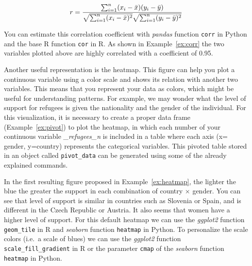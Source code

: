 $$
  r =
  \frac{ \sum_{i=1}^{n}(x_i-\bar{x})(y_i-\bar{y}) }{%
        \sqrt{\sum_{i=1}^{n}(x_i-\bar{x})^2}\sqrt{\sum_{i=1}^{n}(y_i-\bar{y})^2}}
$$

You can estimate this correlation coefficient with \emph{pandas} function \texttt{corr} in Python and the base R function \texttt{cor} in R. As shown in Example~\ref{ex:corr} the two variables plotted above are highly correlated with a coefficient of 0.95.


Another useful representation is the heatmap. This figure can help you plot a continuous variable using a color scale and shows its relation with another two variables.  This means that you represent your data as colors, which might be useful for understanding patterns. For example, we may wonder what  the level of support for refugees is given the nationality and the gender of the individual. For this visualization, it is necessary to create a proper data frame (Example~\ref{ex:pivot}) to plot the heatmap, in which each number of your continuous variable \emph{\_refugees\_n} is included in a table where each axis (x= gender, y=country) represents the categorical variables. This pivoted table stored in an object called \texttt{pivot\_data} can be generated using some of the already explained commands.


In the first resulting figure proposed in Example~\ref{ex:heatmap}, the lighter the blue the greater the support in each combination of country $\times$ gender. You can see that level of support is similar in countries such as Slovenia or Spain, and is different in the Czech Republic or Austria. It also seems that women have a higher level of support. For this default heatmap we can use the \emph{ggplot2} function \texttt{geom\_tile} in R and \emph{seaborn} function \texttt{heatmap} in Python.  To personalize the scale colors (i.e.\ a scale of blues) we can use the \emph{ggplot2} function \texttt{scale\_fill\_gradient} in R or the parameter \texttt{cmap} of the \emph{seaborn} function \texttt{heatmap} in Python.


